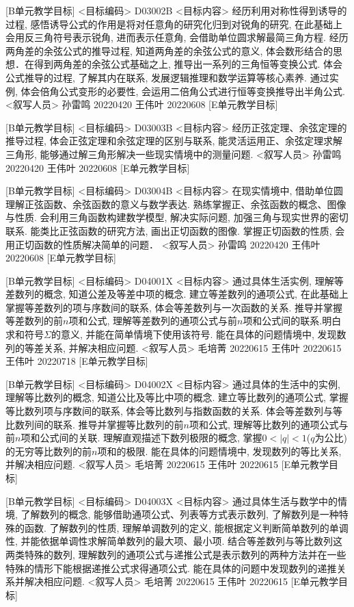 \documentclass[10pt,a4paper]{article}
\begin{document}
[B单元教学目标]
<目标编码>
D03002B
<目标内容>
经历利用对称性得到诱导的过程, 感悟诱导公式的作用是将对任意角的研究化归到对锐角的研究, 在此基础上会用反三角符号表示锐角, 进而表示任意角, 会借助单位圆求解最简三角方程. 经历两角差的余弦公式的推导过程, 知道两角差的余弦公式的意义, 体会数形结合的思想．在得到两角差的余弦公式基础之上, 推导出一系列的三角恒等变换公式. 体会公式推导的过程, 了解其内在联系, 发展逻辑推理和数学运算等核心素养. 通过实例, 体会倍角公式变形的必要性, 会运用二倍角公式进行恒等变换推导出半角公式.
<叙写人员>
孙雷鸣  20220420
王伟叶  20220608
[E单元教学目标]


[B单元教学目标]
<目标编码>
D03003B
<目标内容>
经历正弦定理、余弦定理的推导过程, 体会正弦定理和余弦定理的区别与联系, 能灵活运用正、余弦定理求解三角形, 能够通过解三角形解决一些现实情境中的测量问题.
<叙写人员>
孙雷鸣  20220420
王伟叶  20220608
[E单元教学目标]

[B单元教学目标]
<目标编码>
D03004B
<目标内容>
在现实情境中, 借助单位圆理解正弦函数、余弦函数的意义与数学表达. 熟练掌握正、余弦函数的概念、图像与性质. 会利用三角函数构建数学模型, 解决实际问题, 加强三角与现实世界的密切联系. 能类比正弦函数的研究方法, 画出正切函数的图像. 掌握正切函数的性质, 会用正切函数的性质解决简单的问题．
<叙写人员>
孙雷鸣  20220420
王伟叶  20220608
[E单元教学目标]


[B单元教学目标]
<目标编码>
D04001X
<目标内容>
通过具体生活实例, 理解等差数列的概念, 知道公差及等差中项的概念. 建立等差数列的通项公式, 在此基础上掌握等差数列的项与序数间的联系, 体会等差数列与一次函数的关系. 推导并掌握等差数列的前$n$项和公式, 理解等差数列的通项公式与前$n$项和公式间的联系.明白求和符号$\Sigma$的意义, 并能在简单情境下使用该符号. 能在具体的问题情境中, 发现数列的等差关系, 并解决相应问题.
<叙写人员>
毛培菁  20220615
王伟叶  20220615
王伟叶  20220718
[E单元教学目标]

[B单元教学目标]
<目标编码>
D04002X
<目标内容>
通过具体的生活中的实例, 理解等比数列的概念, 知道公比及等比中项的概念. 建立等比数列的通项公式, 掌握等比数列项与序数间的联系, 体会等比数列与指数函数的关系. 体会等差数列与等比数列间的联系. 推导并掌握等比数列的前$n$项和公式, 理解等比数列的通项公式与前$n$项和公式间的关联. 理解直观描述下数列极限的概念, 掌握$0<|q|<1$($q$为公比)的无穷等比数列的前$n$项和的极限. 能在具体的问题情境中, 发现数列的等比关系, 并解决相应问题.
<叙写人员>
毛培菁  20220615
王伟叶  20220615
[E单元教学目标]

[B单元教学目标]
<目标编码>
D04003X
<目标内容>
通过具体生活与数学中的情境, 了解数列的概念, 能够借助通项公式、列表等方式表示数列, 了解数列是一种特殊的函数. 了解数列的性质, 理解单调数列的定义, 能根据定义判断简单数列的单调性, 并能依据单调性求解简单数列的最大项、最小项. 结合等差数列与等比数列这两类特殊的数列, 理解数列的通项公式与递推公式是表示数列的两种方法并在一些特殊的情形下能根据递推公式求得通项公式. 能在具体的问题中发现数列的递推关系并解决相应问题.
<叙写人员>
毛培菁  20220615
王伟叶  20220615
[E单元教学目标]
\end{document}
